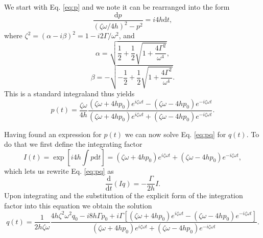 We start with Eq. \eqref{eq:p} and we note it can be rearranged into
the form
\begin{equation}
  \frac{ \mathrm{d} p } { (\zeta \omega / 4 h)^2 - p^2 } = i 4 h
  \mathrm{d} t,
\end{equation}
where $\zeta^2 = (\alpha - i \beta)^2 = 1 - i 2 \Gamma / \omega^2$, and
\begin{equation}
  \alpha = \sqrt{ \frac{1}{2} + \frac{1}{2} \sqrt{1 + \frac{ 4\Gamma^2
      }{ \omega^4 }}},
\end{equation}
\begin{equation}
  \beta = -\sqrt{ -\frac{1}{2} + \frac{1}{2} \sqrt{1 + \frac{ 4\Gamma^2
      }{ \omega^4 }}}.
\end{equation}
This is a standard integral\footnotemark and thus yields
\begin{equation}
  \label{eq:psol}
  p(t) = \frac{ \zeta \omega } { 4 h } 
  \frac{ ( \zeta \omega + 4 h p_0 )e^{i \zeta \omega t} - ( \zeta
    \omega - 4 h p_0 ) e^{-i \zeta \omega t} }
  { ( \zeta \omega + 4 h p_0 )e^{i \zeta \omega t} + ( \zeta \omega
    - 4 h p_0 ) e^{-i \zeta \omega t} }.
\end{equation}

\footnotetext{ \[ \int \frac{\mathrm{d} x}{a^2 - x^2} = \frac{1}{2a}
    \ln \left( \frac{a+x}{a-x} \right) + \mathrm{const.} 
    \quad\quad\quad\quad\quad\quad\quad\quad\quad\quad\quad\quad\quad\quad\quad
    \quad\quad\quad\quad\quad\] }

Having found an expression for $p(t)$ we can now solve
Eq. \eqref{eq:pq} for $q(t)$. To do that we first define the
integrating factor
\begin{equation}
  I(t) = \exp \left[ i 4 h \int p \mathrm{d} t \right] = ( \zeta
  \omega + 4 h p_0 )e^{i \zeta \omega t} + ( \zeta \omega - 4 h p_0 )
  e^{-i \zeta \omega t},
\end{equation}
which lets us rewrite Eq. \eqref{eq:pq} as
\begin{equation}
  \label{eq:Iq}
  \frac{\mathrm{d}} {\mathrm{d} t}(Iq) = - \frac{\Gamma}{2 h} I.
\end{equation}
Upon integrating and the substitution of the explicit form of the
integration factor into this equation we obtain the solution
\begin{equation}
  \label{eq:qsol}
  q(t) = \frac{1}{2 h \zeta \omega} 
  \frac{4 h \zeta^2 \omega^2 q_0 - i 8 h \Gamma p_0
    + i \Gamma [( \zeta \omega + 4 h p_0 )e^{i \zeta \omega t} - 
    ( \zeta \omega - 4 h p_0 )e^{-i \zeta \omega t}]}
  { ( \zeta \omega + 4 h p_0 )e^{i \zeta \omega t} + 
    ( \zeta \omega - 4 h p_0 )e^{-i \zeta \omega t}}.
\end{equation}

